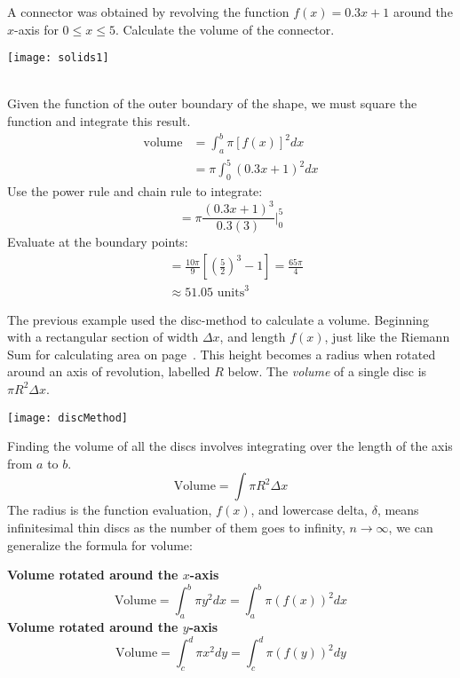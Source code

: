 \begin{multicols}{2}
	\example A connector was obtained by revolving the function $f(x)={0.3x+1}$ around the $x$-axis for $0\leq x \leq 5$. Calculate the volume of the connector.
\begin{center}\texttt{[image: solids1]}\end{center}
\columnbreak
\solution\\ Given the function of the outer boundary of the shape, we must square the function and integrate this result.\\
\begin{align*}
\mathrm{volume}&=\int_{a}^{b}\pi[f(x)]^2 dx\\
&=\pi\int_0^5\left(0.3x+1\right)^2 dx\end{align*}
Use the power rule and chain rule to integrate:\\
\[=\pi \frac{ (0.3x+1)^3}{0.3(3)} \Big|_0^5\]
Evaluate at the boundary points:\\
\begin{align*}
&=\frac{10\pi}{9}\left[\left(\frac{5}{2}\right)^3-1\right]=\frac{65\pi}{4}\\
&\approx 51.05 \text{ units}^3
\end{align*}
\end{multicols}

\clearpage
The previous example used the disc-method to calculate a volume. Beginning with a rectangular section of width $\Delta x$, and length $f(x)$, just like the Riemann Sum for calculating area on page~\pageref{fig:riemann}. This height becomes a radius when rotated around an axis of revolution, labelled $R$ below. The \textit{volume} of a single disc is $\pi R^2\Delta x$. 
\begin{center}\texttt{[image: discMethod]}\end{center}
Finding the volume of all the discs involves integrating over the length of the axis from $a$ to $b$.\[\text{Volume}=\int \pi R^2 \Delta x\] The radius is the function evaluation, $f(x)$, and lowercase delta, $\delta$, means infinitesimal thin discs as the number of them goes to infinity, $n\rightarrow\infty$,  we can generalize the formula for volume:
\begin{tcolorbox}
	\textbf{Volume rotated around the $x$-axis}
	\[ \text{Volume} = \int_{a}^{b} \pi y^2 dx = \int_{a}^{b} \pi (f(x))^2 dx\]
	\textbf{Volume rotated around the $y$-axis}
	\[ \text{Volume} = \int_{c}^{d} \pi x^2 dy =\int_{c}^{d} \pi (f(y))^2 dy  \]
\end{tcolorbox}



